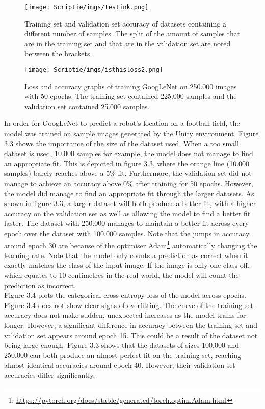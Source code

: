 \documentclass{uva-inf-bachelor-thesis}
\begin{document}
            \begin{figure}[H]
            \centering
            \texttt{[image: Scriptie/imgs/testink.png]}
            \caption{Training set and validation set accuracy of datasets containing a different number of samples. The split of the amount of samples that are in the training set and that are in the validation set are noted between the brackets.}
            \end{figure}
            
            \begin{figure}[H]
            \centering
            \texttt{[image: Scriptie/imgs/isthisloss2.png]}
            \caption{Loss and accuracy graphs of training GoogLeNet on 250.000 images with 50 epochs. The training set contained 225.000 samples and the validation set contained 25.000 samples.}
            \end{figure}

            In order for GoogLeNet to predict a robot's location on a football field, the model was trained on sample images generated by the Unity environment. Figure 3.3 shows the importance of the size of the dataset used. When a too small dataset is used, 10.000 samples for example, the model does not manage to find an appropriate fit. This is depicted in figure 3.3, where the orange line (10.000 samples) barely reaches above a 5\% fit. Furthermore, the validation set did not manage to achieve an accuracy above 0\% after training for 50 epochs. However, the model did manage to find an appropriate fit through the larger datasets. As shown in figure 3.3, a larger dataset will both produce a better fit, with a higher accuracy on the validation set as well as allowing the model to find a better fit faster. The dataset with 250.000 manages to maintain a better fit across every epoch over the dataset with 100.000 samples. Note that the jumps in accuracy around epoch 30 are because of the optimiser Adam\footnote{\url{https://pytorch.org/docs/stable/generated/torch.optim.Adam.html}} automatically changing the learning rate.
            Note that the model only counts a prediction as correct when it exactly matches the class of the input image. If the image is only one class off, which equates to 10 centimetres in the real world, the model will count the prediction as incorrect.
            \hfill \break \\
            Figure 3.4 plots the categorical cross-entropy loss of the model across epochs. Figure 3.4 does not show clear signs of overfitting. The curve of the training set accuracy does not make sudden, unexpected increases as the model trains for longer. However, a significant difference in accuracy between the training set and validation set appears around epoch 15. This could be a result of the dataset not being large enough. Figure 3.3 shows that the datasets of sizes 100.000 and 250.000 can both produce an almost perfect fit on the training set, reaching almost identical accuracies around epoch 40. However, their validation set accuracies differ significantly. 
\end{document}
